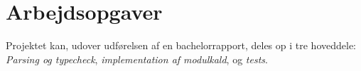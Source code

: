 \documentclass[12pt]{article}
\begin{document}

\section{Arbejdsopgaver}
Projektet kan, udover udførelsen af en bachelorrapport, deles op i tre
hoveddele:\\
\textit{Parsing og typecheck}, \textit{implementation af modulkald}, og \textit{tests}.
\end{document}
